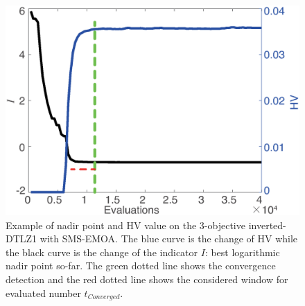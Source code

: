 \documentclass[conference]{IEEEtran}
\begin{document}
\begin{figure}[!t]
  \centering
    \includegraphics[width=\columnwidth]{FVEMOA_IDTLZ1_M3_nadir_1}
  \caption{Example of nadir point and HV value on the 3-objective inverted-DTLZ1
  with SMS-EMOA.
  The blue curve is the change of HV 
  while the black curve is the change of the indicator $I$: best logarithmic nadir point so-far.
  The green dotted line shows the convergence detection 
  and the red dotted line shows the considered window for evaluated number $t_{Converged}$. 
  }
  \label{wcd1}
\end{figure}
\end{document}
